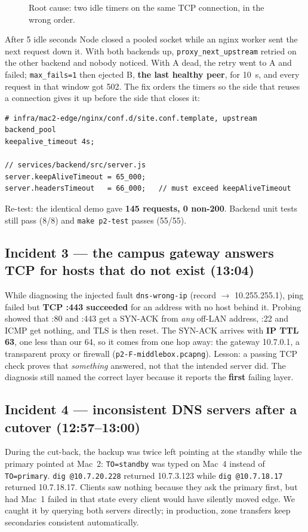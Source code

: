 \documentclass[11pt,a4paper]{article}
\begin{document}
\begin{figure}[H]
\centering
\resizebox{\textwidth}{!}{\drawKeepalive}
\caption{Root cause: two idle timers on the same TCP connection, in the wrong order.}
\end{figure}

After 5 idle seconds Node closed a pooled socket while an nginx worker sent the next request down
it. With both backends up, \texttt{proxy\_next\_upstream} retried on the other backend and nobody
noticed. With A dead, the retry went to A and failed; \texttt{max\_fails=1} then ejected B,
\textbf{the last healthy peer}, for 10~s, and every request in that window got 502. The fix orders
the timers so the side that reuses a connection gives it up before the side that closes it:

\begin{lstlisting}
# infra/mac2-edge/nginx/conf.d/site.conf.template, upstream backend_pool
keepalive_timeout 4s;

// services/backend/src/server.js
server.keepAliveTimeout = 65_000;
server.headersTimeout   = 66_000;   // must exceed keepAliveTimeout
\end{lstlisting}
Re-test: the identical demo gave \textbf{145 requests, 0 non-200}. Backend unit tests still pass
(8/8) and \texttt{make p2-test} passes (55/55).

\subsection{Incident 3 --- the campus gateway answers TCP for hosts that do not exist (13:04)}
While diagnosing the injected fault \texttt{dns-wrong-ip} (record $\to$ 10.255.255.1), ping failed but
\textbf{TCP :443 succeeded} for an address with no host behind it. Probing showed that :80 and :443
get a SYN-ACK from \emph{any} off-LAN address, :22 and ICMP get nothing, and TLS is then reset. The
SYN-ACK arrives with \textbf{IP TTL 63}, one less than our 64, so it comes from one hop away: the
gateway 10.7.0.1, a transparent proxy or firewall (\texttt{p2-F-middlebox.pcapng}). Lesson: a
passing TCP check proves that \emph{something} answered, not that the intended server did. The
diagnosis still named the correct layer because it reports the \textbf{first} failing layer.

\subsection{Incident 4 --- inconsistent DNS servers after a cutover (12:57--13:00)}
During the cut-back, the backup was twice left pointing at the standby while the primary pointed
at Mac~2: \texttt{TO=standby} was typed on Mac~4 instead of \texttt{TO=primary}.
\texttt{dig @10.7.20.228} returned 10.7.3.123 while \texttt{dig @10.7.18.17} returned 10.7.18.17.
Clients saw nothing because they ask the primary first, but had Mac~1 failed in that state every
client would have silently moved edge. We caught it by querying both servers directly; in
production, zone transfers keep secondaries consistent automatically.
\end{document}
